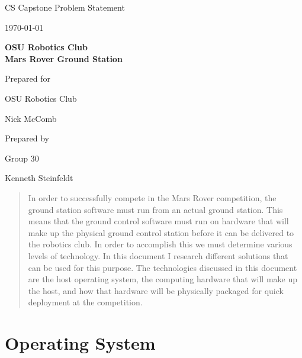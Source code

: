 \documentclass[onecolumn, draftclsnofoot, 10pt, compsoc]{IEEEtran}
\def \CapstoneTeamName{			}
\def \CapstoneTeamNumber{		30}
\def \GroupMemberOne{			Kenneth Steinfeldt}
\def \CapstoneProjectName{		OSU Robotics Club\\Mars Rover Ground Station}
\def \CapstoneSponsorCompany{	OSU Robotics Club}
\def \CapstoneSponsorPerson{	Nick McComb}
\def \DocType{	Problem Statement
			 }
\newcommand{\NameSigPair}[1]{
  \par
  \makebox[2.75in][r]{#1} 
  \hfill
  \makebox[3.25in]{
      \makebox[2.25in]{\hrulefill} 
      \hfill
      \makebox[.75in]{\hrulefill}
  }
  \par\vspace{-12pt} 
  \textit{
      \tiny\noindent
      \makebox[2.75in]{} 
      \hfill
      \makebox[3.25in]{
          \makebox[2.25in][r]{Signature} 
          \hfill
          \makebox[.75in][r]{Date}
      }
  }
}
\renewcommand{\NameSigPair}[1]{#1}
\begin{document}
\begin{titlepage}
\begin{singlespace}
		\par\vspace{.35in}
		\centering
		\scshape{
			\huge CS Capstone \DocType \par
			{\large\today}\par
			\vspace{.5in}
			\textbf{\Huge\CapstoneProjectName}\par
			\vfill
			{\large Prepared for}\par
			\Huge \CapstoneSponsorCompany\par
			\vspace{5pt}
			{\Large\NameSigPair{\CapstoneSponsorPerson}\par}
			{\large Prepared by }\par
			Group\CapstoneTeamNumber\par
			\vspace{5pt}
			{\Large
				\NameSigPair{\GroupMemberOne}\par
			}
			\vspace{20pt}
		}
		\begin{abstract}
            In order to successfully compete in the Mars Rover competition, the ground station software must run from an actual ground station.
            This means that the ground control software must run on hardware that will make up the physical ground control station before it can be delivered to the robotics club.
            In order to accomplish this we must determine various levels of technology.
            In this document I research different solutions that can be used for this purpose.
            The technologies discussed in this document are the host operating system, the computing hardware that will make up the host, and how that hardware will be physically packaged for quick deployment at the competition.
            
		\end{abstract}
	\end{singlespace}
\end{titlepage}
\newpage
{}
\tableofcontents
\clearpage

\section{Operating System}\par
\end{document}
